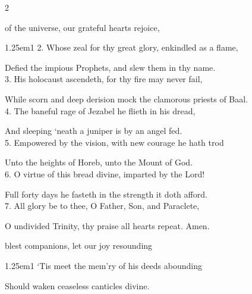 \begin{paracol}{2}
\sloppy

\vspace{-1\baselineskip}

\mattinsInvitatoryHymn

 of the universe, our grateful hearts rejoice,


\begin{hangparas}{1.25em}{1}
2. Whose zeal for thy great glory, enkindled as a flame,

Defied the impious Prophets, and slew them in thy name.\\

3. His holocaust ascendeth, for thy fire may never fail,

While scorn and deep derision mock the clamorous priests of Baal.\\

4. The baneful rage of Jezabel he flieth in his dread,

And sleeping `neath a juniper is by an angel fed.\\

5. Empowered by the vision, with new courage he hath trod

Unto the heights of Horeb, unto the Mount of God.\\

6. O virtue of this bread divine, imparted by the Lord!

Full forty days he fasteth in the strength it doth afford.\\

7. All glory be to thee, O Father, Son, and Paraclete,

O undivided Trinity, thy praise all hearts repeat. Amen.
\end{hangparas}

\switchcolumn

\vspace{-1\baselineskip}

\mattinsOfficeHymn
{} blest companions, let our joy resounding


\begin{hangparas}{1.25em}{1}
`Tis meet the mem'ry of his deeds abounding

Should waken ceaseless canticles divine.\\


\end{hangparas}
\end{paracol}
